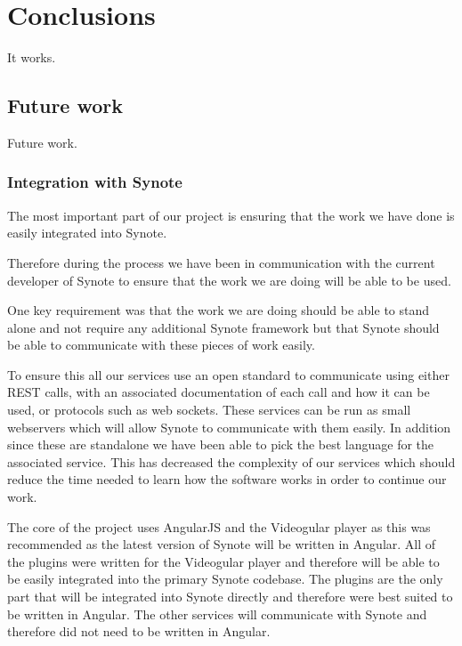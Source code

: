 \chapter{Conclusions} \label{Chapter: Conclusions}
It works.

\section{Future work}

Future work.

\subsection{Integration with Synote}

The most important part of our project is ensuring that the work we have done is easily integrated into Synote.

Therefore during the process we have been in communication with the current developer of Synote to ensure that the work we are doing will be able to be used.

One key requirement was that the work we are doing should be able to stand alone and not require any additional Synote framework but that Synote should be able to communicate with these pieces of work easily.

To ensure this all our services use an open standard to communicate using either \gls{REST} calls, with an associated documentation of each call and how it can be used, or protocols such as web sockets. These services can be run as small webservers which will allow Synote to communicate with them easily. In addition since these are standalone we have been able to pick the best language for the associated service. This has decreased the complexity of our services which should reduce the time needed to learn how the software works in order to continue our work.

The core of the project uses \gls{AngularJS} and the \gls{Videogular} player as this was recommended as the latest version of Synote will be written in Angular. All of the plugins were written for the \gls{Videogular} player and therefore will be able to be easily integrated into the primary Synote codebase. The plugins are the only part that will be integrated into Synote directly and therefore were best suited to be written in Angular. The other services will communicate with Synote and therefore did not need to be written in Angular.

